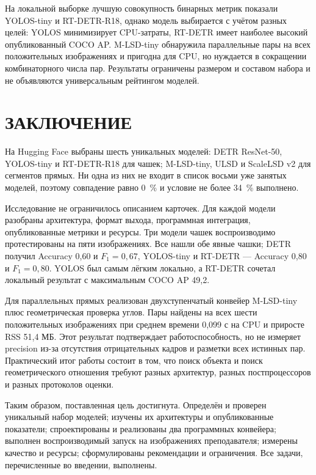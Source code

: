 \documentclass[a4paper,12pt]{extreport}
\newcommand{\structel}[1]{%
  \clearpage\phantomsection\addcontentsline{toc}{chapter}{\MakeUppercase{#1}}%
  \chapter*{\MakeUppercase{#1}}}
\begin{document}
На локальной выборке лучшую совокупность бинарных метрик показали YOLOS-tiny и RT-DETR-R18, однако модель выбирается с учётом разных целей: YOLOS минимизирует CPU-затраты, RT-DETR имеет наиболее высокий опубликованный COCO AP. M-LSD-tiny обнаружила параллельные пары на всех положительных изображениях и пригодна для CPU, но нуждается в сокращении комбинаторного числа пар. Результаты ограничены размером и составом набора и не объявляются универсальным рейтингом моделей.

\structel{ЗАКЛЮЧЕНИЕ}

На Hugging Face выбраны шесть уникальных моделей: DETR ResNet-50, YOLOS-tiny и RT-DETR-R18 для чашек; M-LSD-tiny, ULSD и ScaleLSD v2 для сегментов прямых. Ни одна из них не входит в список восьми уже занятых моделей, поэтому совпадение равно 0~\% и условие не более 34~\% выполнено.

Исследование не ограничилось описанием карточек. Для каждой модели разобраны архитектура, формат выхода, программная интеграция, опубликованные метрики и ресурсы. Три модели чашек воспроизводимо протестированы на пяти изображениях. Все нашли обе явные чашки; DETR получил Accuracy 0,60 и $F_1=0,67$, YOLOS-tiny и RT-DETR --- Accuracy 0,80 и $F_1=0,80$. YOLOS был самым лёгким локально, а RT-DETR сочетал локальный результат с максимальным COCO AP 49,2.

Для параллельных прямых реализован двухступенчатый конвейер M-LSD-tiny плюс геометрическая проверка углов. Пары найдены на всех шести положительных изображениях при среднем времени 0,099 с на CPU и приросте RSS 51,4 МБ. Этот результат подтверждает работоспособность, но не измеряет precision из-за отсутствия отрицательных кадров и разметки всех истинных пар. Практический итог работы состоит в том, что поиск объекта и поиск геометрического отношения требуют разных архитектур, разных постпроцессоров и разных протоколов оценки.

Таким образом, поставленная цель достигнута. Определён и проверен уникальный набор моделей; изучены их архитектуры и опубликованные показатели; спроектированы и реализованы два программных конвейера; выполнен воспроизводимый запуск на изображениях преподавателя; измерены качество и ресурсы; сформулированы рекомендации и ограничения. Все задачи, перечисленные во введении, выполнены.
\end{document}

